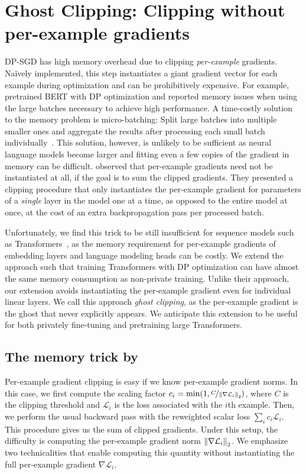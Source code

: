 
\section{Ghost Clipping: Clipping without per-example gradients}
DP-SGD has high memory overhead due to clipping \textit{per-example} gradients.
Na\"ively implemented, this step instantiates a giant gradient vector for each example during optimization and can be prohibitively expensive.
For example, \cite{hoory2021learning} pretrained BERT with DP optimization and reported memory issues when using the large batches necessary to achieve high performance.
A time-costly solution to the memory problem is micro-batching: Split large batches into multiple smaller ones and aggregate the results after processing each small batch individually~\citep{tramer2020differentially}.
This solution, however, is unlikely to be sufficient as neural language models become larger and fitting even a few copies of the gradient in memory can be difficult.
\cite{lee2020scaling} observed that per-example gradients need not be instantiated at all, if the goal is to sum the clipped gradients. 
They presented a clipping procedure that only instantiates the per-example gradient for parameters of a \textit{single} layer in the model one at a time, as opposed to the entire model at once, at the cost of an extra backpropagation pass per processed batch. 


Unfortunately, we find this trick to be still insufficient for sequence models such as Transformers~\citep{vaswani2017attention}, as the memory requirement for per-example gradients of embedding layers and language modeling heads can be costly. We extend the \cite{lee2020scaling} approach such that training Transformers with DP optimization can have almost the same memory consumption as non-private training. 
Unlike their approach, our extension avoids instantiating the per-example gradient even for individual linear layers.
We call this approach \textit{ghost clipping}, as the per-example gradient is the ghost that never explicitly appears.
We anticipate this extension to be useful for both privately fine-tuning and pretraining large Transformers.

\subsection{The memory trick by~\cite{lee2020scaling}}
Per-example gradient clipping is easy if we know per-example gradient norms. In this case, we first compute the scaling factor $c_i = \min(1, \nicefrac{C}{ \left\lVert \nabla \mathcal{L}_i\right\rVert_2 })$, where $C$ is the clipping threshold and $\mathcal{L}_i$ is the loss associated with the $i$th example. Then, we perform the usual backward pass with the reweighted scalar loss $ \sum_{i} c_i \mathcal{L}_i $. This procedure gives us the sum of clipped gradients.
Under this setup, the difficulty is computing the per-example gradient norm $\left\lVert\nabla \mathcal{L}_i\right\rVert_2$. 
We emphasize two technicalities that enable computing this quantity without instantiating the full per-example gradient $\nabla \mathcal{L}_i$. 


